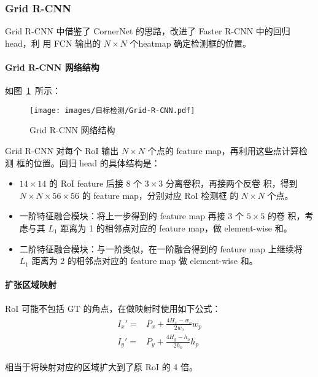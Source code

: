 \subsubsection{Grid R-CNN}
Grid R-CNN 中借鉴了 CornerNet 的思路，改进了 Faster R-CNN 中的回归 head，利
用 FCN 输出的 $N \times N$ 个heatmap 确定检测框的位置。

\paragraph{Grid R-CNN 网络结构}
如图~\ref{fig:Grid-RCNN}~所示：

\begin{figure}[ht]
  \centering
  \texttt{[image: images/目标检测/Grid-R-CNN.pdf]}
  \caption{Grid R-CNN 网络结构}
  \label{fig:Grid-RCNN}
\end{figure}

Grid R-CNN 对每个 RoI 输出 $N \times N$ 个点的 feature map，再利用这些点计算检测
框的位置。回归 head 的具体结构是：

\begin{itemize}
  \item $14 \times 14$ 的 RoI feature 后接 8 个 $3 \times 3$ 分离卷积，再接两个反卷
    积，得到 $N \times N \times 56 \times 56$ 的 feature map，分别对应 RoI 检测框
    的 $N \times N$ 个点。
  \item 一阶特征融合模块：将上一步得到的 feature map 再接 3 个 $5 \times 5$ 的卷
    积，考虑与其 $L_1$ 距离为 1 的相邻点对应的 feature map，做 element-wise 和。
  \item 二阶特征融合模块：与一阶类似，在一阶融合得到的 feature map 上继续将
    $L_1$ 距离为 2 的相邻点对应的 feature map 做 element-wise 和。
\end{itemize}

\paragraph{扩张区域映射}
RoI 可能不包括 GT 的角点，在做映射时使用如下公式：
\begin{align}
  \label{equ:yolo-v1-loss}
  \begin{split}
    I_x' = & P_x + \frac{4H_{x} - w_o}{2w_o} w_p  \\
    I_y' = & P_y + \frac{4H_{y} - h_o}{2h_o} h_p 
  \end{split}
\end{align}

相当于将映射对应的区域扩大到了原 RoI 的 4 倍。

